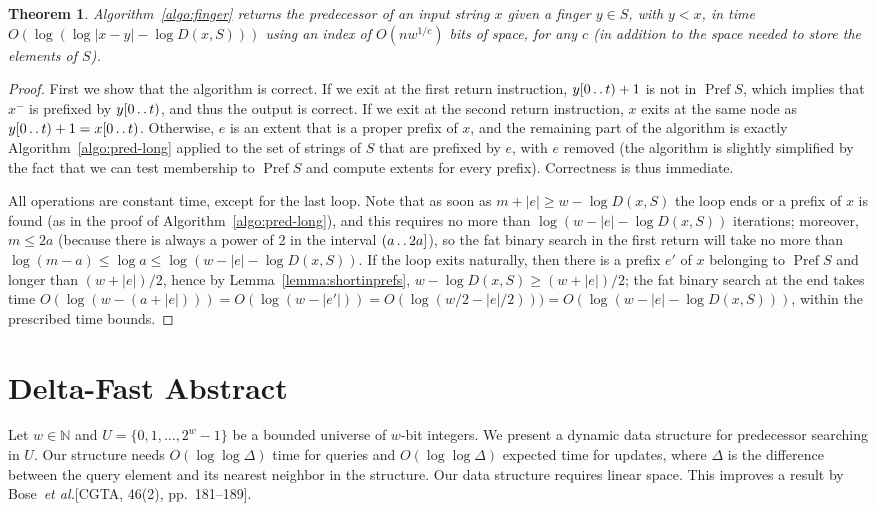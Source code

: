 \documentclass[a4paper,11pt]{article}
\newtheorem{theorem}{Theorem}[section]
\newcommand{\N}{\mathbb{N}}
\newcommand{\etal}{\emph{et al.}\xspace}
\newcommand{\?}{\mskip1.5mu}
\def\..{\,\mathpunct{\ldotp\ldotp}} %
\DeclareMathOperator{\Pref}{Pref}
\begin{document}
\begin{theorem}
\label{th:finger}
Algorithm~\ref{algo:finger} returns the predecessor of an input string $x$ given
a finger $y\in S$, with $y<x$, in time $O(\log(\log|x-y|-\log D(x,S)))$ using an 
index of $O(n w^{1/c})$ bits 
of space, for any $c$ (in addition to the space needed to store the elements of $S$).
\end{theorem}
\begin{proof}
First we show that the algorithm is correct. 
If we exit at the first return instruction, $y[0\..t)+1$ is
not in $\Pref S$, which implies that $x^-$ is prefixed by $y[0\..t)$, and thus
the output is correct. If we exit at the second return instruction, $x$
exits at the same node as $y[0\..t)+1=x[0\..t)$. Otherwise, $e$ is an extent
that is a proper prefix of $x$, and the remaining part of the algorithm
is exactly Algorithm~\ref{algo:pred-long} applied to the set of strings of $S$ 
that are prefixed by $e$, with $e$ removed (the algorithm is slightly
simplified by the fact that we can test membership to $\Pref S$ and compute
extents for every prefix). Correctness is thus immediate.

All operations are constant time, except for the last loop. Note that as soon as
$m+|e|\geq w-\log D(x,S)$ the loop ends or a prefix of $x$ is found (as in the
proof of Algorithm~\ref{algo:pred-long}), and this requires no more than $\log(w-|e|-\log
D(x,S))$ iterations; moreover, $m\leq 2a$ (because there is always
a power of 2 in the interval $(a\..2a]$), so the fat binary search in the first
return will take no more than $\log(m-a)\leq \log a\leq \log (w-|e|-\log D(x,S))$.
If the loop exits naturally, then there is a prefix $e'$ of $x$ belonging
to $\Pref S$ and longer than $(w+|e|)/2$, hence by
Lemma~\ref{lemma:shortinprefs}, $w-\log D(x,S)\geq (w+|e|)/2$; the fat binary search at the
end takes time $O(\log (w-(a+|e|)))=O(\log (w-|e'|))=O(\log( w/2 -
|e|/2)))=O(\log(w-|e|-\log D(x,S)))$, within the prescribed time bounds.
\end{proof}

\section{Delta-Fast Abstract}
Let $w \in \N$ and $U = \{0, 1, \dots, 2^w-1\}$ be a 
bounded universe of $w$-bit integers.  We present a 
dynamic data structure for predecessor searching in 
$U$.  Our structure needs $O(\log \log \Delta)$ time 
for queries and $O(\log \log \Delta)$ expected time 
for updates, where $\Delta$ is the difference between 
the query element and its nearest neighbor in the 
structure. Our data structure requires linear space. 
This improves a result by Bose~\etal [CGTA, 46(2), pp.~181--189].
\end{document}
